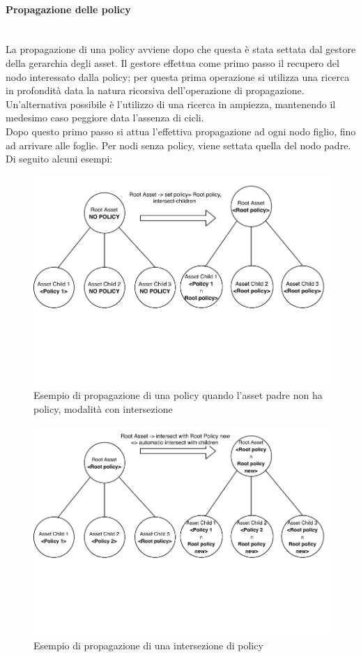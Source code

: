\documentclass[12pt,a4paper,twoside]{book}
\begin{document}
\paragraph{Propagazione delle policy}\label{propagation}\mbox{}\\
La propagazione di una policy avviene dopo che questa è stata settata dal gestore della gerarchia degli asset. Il gestore effettua come primo passo il recupero del nodo interessato dalla policy; per questa prima operazione si utilizza una ricerca in profondità data la natura ricorsiva dell'operazione di propagazione. Un'alternativa possibile è l'utilizzo di una ricerca in ampiezza, mantenendo il medesimo caso peggiore data l'assenza di cicli.\\
Dopo questo primo passo si attua l'effettiva propagazione ad ogni nodo figlio, fino ad arrivare alle foglie. Per nodi senza policy, viene settata quella del nodo padre.\\
Di seguito alcuni esempi:
\begin{figure}[H]
\centering
\includegraphics[scale=.65]{../immagini/assetSetPropagation.pdf}
\caption{Esempio di propagazione di una policy quando l'asset padre non ha policy, modalità con intersezione}
\label{imgAssetPropSet}
\end{figure}
\begin{figure}[H]
\centering
\includegraphics[scale=.65]{../immagini/assetIntersectPropagation.pdf}
\caption{Esempio di propagazione di una intersezione di policy}
\label{imgAssetPropIntersect}
\end{figure}
\end{document}
